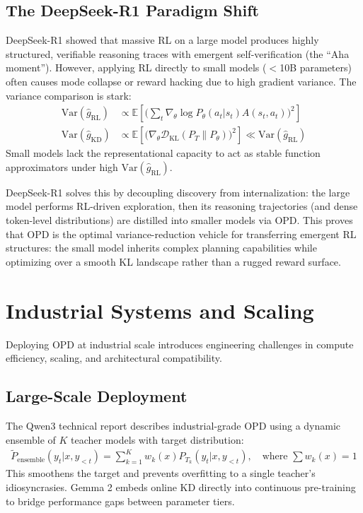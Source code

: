 \documentclass{article} %
\begin{document}
\subsection{The DeepSeek-R1 Paradigm Shift}
DeepSeek-R1 \citep{2501.12948} showed that massive RL on a large model produces highly structured, verifiable reasoning traces with emergent self-verification (the ``Aha moment''). However, applying RL directly to small models ($<$10B parameters) often causes mode collapse or reward hacking due to high gradient variance. The variance comparison is stark:
\begin{align}
\text{Var}(\hat{g}_{\text{RL}}) &\propto \mathbb{E}\left[ \Big( \sum_t \nabla_\theta \log P_\theta(a_t|s_t) A(s_t, a_t) \Big)^2 \right] \\
\text{Var}(\hat{g}_{\text{KD}}) &\propto \mathbb{E}\left[ \Big( \nabla_\theta \mathcal{D}_{\text{KL}}(P_T \parallel P_\theta) \Big)^2 \right] \ll \text{Var}(\hat{g}_{\text{RL}})
\end{align}
Small models lack the representational capacity to act as stable function approximators under high $\text{Var}(\hat{g}_{\text{RL}})$.

DeepSeek-R1 solves this by decoupling discovery from internalization: the large model performs RL-driven exploration, then its reasoning trajectories (and dense token-level distributions) are distilled into smaller models via OPD. This proves that OPD is the optimal variance-reduction vehicle for transferring emergent RL structures: the small model inherits complex planning capabilities while optimizing over a smooth KL landscape rather than a rugged reward surface.

\section{Industrial Systems and Scaling}
\label{sec:systems}

Deploying OPD at industrial scale introduces engineering challenges in compute efficiency, scaling, and architectural compatibility.

\subsection{Large-Scale Deployment}
The Qwen3 technical report \citep{2505.09388} describes industrial-grade OPD using a dynamic ensemble of $K$ teacher models with target distribution:
\begin{align}
\tilde{P}_{\text{ensemble}}(y_t | x, y_{<t}) = \sum_{k=1}^K w_k(x) P_{T_k}(y_t | x, y_{<t}), \quad \text{where } \sum w_k(x) = 1
\end{align}
This smoothens the target and prevents overfitting to a single teacher's idiosyncrasies. Gemma 2 \citep{2408.00118} embeds online KD directly into continuous pre-training to bridge performance gaps between parameter tiers.
\end{document}
